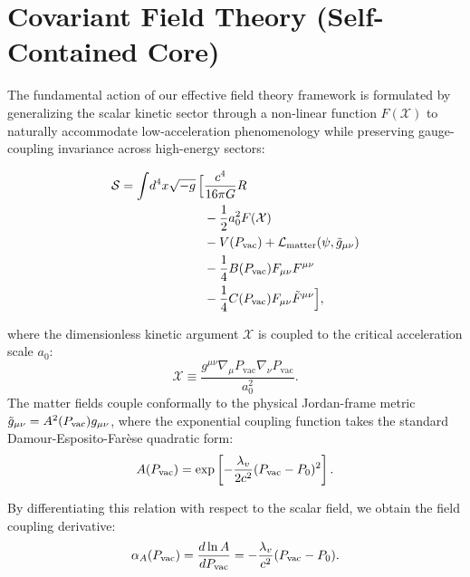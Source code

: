 \documentclass[prd,
               reprint,
               aps,
               preprintnumbers,
               nofootinbib,
               longbibliography,
               floatfix]{revtex4-2}
\begin{document}
\section{Covariant Field Theory (Self-Contained Core)}
\label{sec:master}

The fundamental action of our effective field theory framework
is formulated by generalizing the scalar kinetic sector through
a non-linear function $F(\mathcal{X})$ to naturally accommodate
low-acceleration phenomenology while preserving gauge-coupling
invariance across high-energy sectors:

\begin{equation}
\label{eq:master_action}
\begin{aligned}
\mathcal{S} = \int\! d^4x\sqrt{-g}\, \Big[ &\frac{c^4}{16\pi G}R \\
&-\frac{1}{2} a_0^2 F(\mathcal{X}) \\
&-V(P_{\rm vac}) + \mathcal{L}_{\rm matter}(\psi,\tilde{g}_{\mu\nu}) \\
&-\frac14 B(P_{\rm vac})F_{\mu\nu}F^{\mu\nu} \\
&-\frac14 C(P_{\rm vac})F_{\mu\nu}\tilde{F}^{\mu\nu} \Big],
\end{aligned}
\end{equation}

where the dimensionless kinetic argument $\mathcal{X}$ is coupled
to the critical acceleration scale $a_0$:
\begin{equation}
\mathcal{X} \equiv \frac{g^{\mu\nu}\nabla_\mu P_{\text{vac}} 
\nabla_\nu P_{\text{vac}}}{a_0^2}.
\end{equation}
The matter fields couple conformally to the physical Jordan-frame
metric $\tilde{g}_{\mu\nu} = A^2(P_{\rm vac})g_{\mu\nu}$, where
the exponential coupling function takes the standard 
Damour-Esposito-Far\`ese quadratic form:
\begin{equation}
\label{eq:A_quadratic}
A(P_{\rm vac}) = \exp\left[ -\frac{\lambda_v}{2c^2}
(P_{\rm vac} - P_0)^2 \right].
\end{equation}

By differentiating this relation with respect to the scalar field,
we obtain the field coupling derivative:
\begin{equation}
\label{eq:alpha_A_deriv}
\alpha_A(P_{\rm vac}) = \frac{d\ln A}{dP_{\rm vac}} =
-\frac{\lambda_v}{c^2}(P_{\rm vac} - P_0).
\end{equation}
\end{document}

